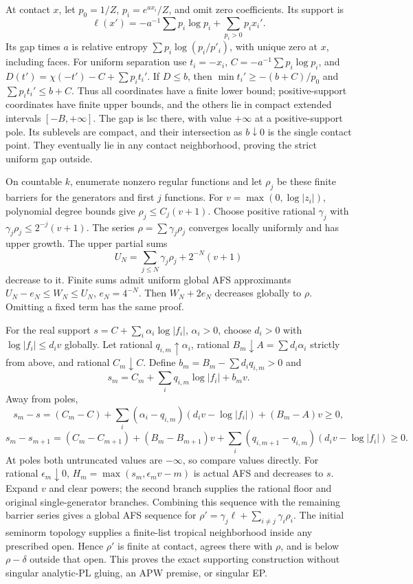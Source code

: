 \documentclass[
  11pt,
]{article}
\begin{document}
At contact \(x\), let \(p_0=1/Z\), \(p_i=e^{ax_i}/Z\), and omit zero
coefficients. Its support is
\[\ell(x')=-a^{-1}\sum p_i\log p_i+\sum_{p_i>0}p_ix_i'.\] Its gap times
\(a\) is relative entropy \(\sum p_i\log(p_i/p'_i)\), with unique zero
at \(x\), including faces. For uniform separation use \(t_i=-x_i\),
\(C=-a^{-1}\sum p_i\log p_i\), and \(D(t')=\chi(-t')-C+\sum p_i t_i'\).
If \(D\le b\), then \(\min t_i'\ge-(b+C)/p_0\) and
\(\sum p_i t_i'\le b+C\). Thus all coordinates have a finite lower
bound; positive-support coordinates have finite upper bounds, and the
others lie in compact extended intervals \([-B,+\infty]\). The gap is
lsc there, with value \(+\infty\) at a positive-support pole. Its
sublevels are compact, and their intersection as \(b\downarrow0\) is the
single contact point. They eventually lie in any contact neighborhood,
proving the strict uniform gap outside.

On countable \(k\), enumerate nonzero regular functions and let
\(\rho_j\) be these finite barriers for the generators and first \(j\)
functions. For \(v=\max(0,\log|z_i|)\), polynomial degree bounds give
\(\rho_j\le C_j(v+1)\). Choose positive rational \(\gamma_j\) with
\(\gamma_j\rho_j\le2^{-j}(v+1)\). The series \(\rho=\sum\gamma_j\rho_j\)
converges locally uniformly and has upper growth. The upper partial sums
\[U_N=\sum_{j\le N}\gamma_j\rho_j+2^{-N}(v+1)\] decrease to it. Finite
sums admit uniform global AFS approximants \(U_N-e_N\le W_N\le U_N\),
\(e_N=4^{-N}\). Then \(W_N+2e_N\) decreases globally to \(\rho\).
Omitting a fixed term has the same proof.

For the real support \(s=C+\sum_i\alpha_i\log|f_i|\), \(\alpha_i>0\),
choose \(d_i>0\) with \(\log|f_i|\le d_iv\) globally. Let rational
\(q_{i,m}\uparrow\alpha_i\), rational
\(B_m\downarrow A=\sum d_i\alpha_i\) strictly from above, and rational
\(C_m\downarrow C\). Define \(b_m=B_m-\sum d_iq_{i,m}>0\) and
\[s_m=C_m+\sum_i q_{i,m}\log|f_i|+b_mv.\] Away from poles,
\[s_m-s=(C_m-C)+\sum_i(\alpha_i-q_{i,m})(d_iv-\log|f_i|)+(B_m-A)v\ge0,\]
\[s_m-s_{m+1}=(C_m-C_{m+1})+(B_m-B_{m+1})v
              +\sum_i(q_{i,m+1}-q_{i,m})(d_iv-\log|f_i|)\ge0.\] At poles
both untruncated values are \(-\infty\), so compare values directly. For
rational \(\epsilon_m\downarrow0\), \(H_m=\max(s_m,\epsilon_mv-m)\) is
actual AFS and decreases to \(s\). Expand \(v\) and clear powers; the
second branch supplies the rational floor and original single-generator
branches. Combining this sequence with the remaining barrier series
gives a global AFS sequence for
\(\rho'=\gamma_j\ell+\sum_{i\ne j}\gamma_i\rho_i\). The initial seminorm
topology supplies a finite-list tropical neighborhood inside any
prescribed open. Hence \(\rho'\) is finite at contact, agrees there with
\(\rho\), and is below \(\rho-\delta\) outside that open. This proves
the exact supporting construction without singular analytic-PL gluing,
an APW premise, or singular EP.
\end{document}
